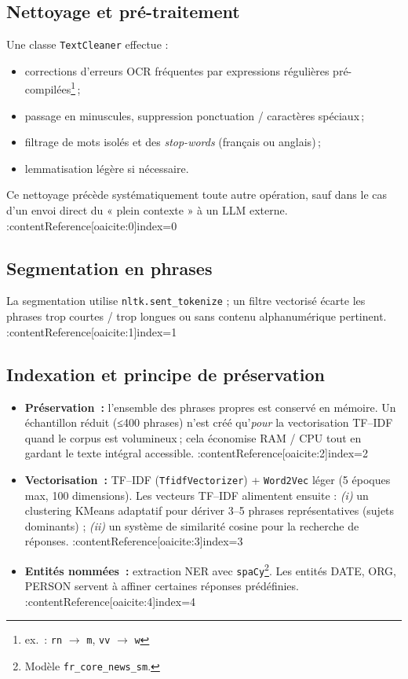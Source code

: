\documentclass[12pt,a4paper]{report}
\begin{document}
\subsection{Nettoyage et pré-traitement}

Une classe \texttt{TextCleaner} effectue :

\begin{itemize}
  \item corrections d’erreurs OCR fréquentes par expressions régulières pré-compilées\footnote{ex.~: \texttt{rn} $\rightarrow$ \texttt{m}, \texttt{vv} $\rightarrow$ \texttt{w}}\,;
  \item passage en minuscules, suppression ponctuation / caractères spéciaux\,;
  \item filtrage de mots isolés et des \emph{stop-words} (français ou anglais)\,;
  \item lemmatisation légère si nécessaire.
\end{itemize}

Ce nettoyage précède systématiquement toute autre opération, sauf dans le cas d’un envoi direct du « plein contexte » à un LLM externe. :contentReference[oaicite:0]{index=0}

\subsection{Segmentation en phrases}

La segmentation utilise \verb|nltk.sent_tokenize| ; un filtre vectorisé écarte les phrases trop courtes / trop longues ou sans contenu alphanumérique pertinent. :contentReference[oaicite:1]{index=1}

\subsection{Indexation et principe de préservation}

\begin{itemize}
  \item \textbf{Préservation~:} l’ensemble des phrases propres est conservé en mémoire.  
        Un échantillon réduit (≤400 phrases) n’est créé qu’\emph{pour} la vectorisation TF–IDF quand le corpus est volumineux ; cela économise RAM / CPU tout en gardant le texte intégral accessible. :contentReference[oaicite:2]{index=2}
  \item \textbf{Vectorisation~:} TF–IDF (\texttt{TfidfVectorizer}) + \texttt{Word2Vec} léger (5 époques max, 100 dimensions).  
        Les vecteurs TF–IDF alimentent ensuite :  
        \emph{(i)} un clustering KMeans adaptatif pour dériver 3–5 phrases représentatives (sujets dominants) ;  
        \emph{(ii)} un système de similarité cosine pour la recherche de réponses. :contentReference[oaicite:3]{index=3}
  \item \textbf{Entités nommées~:} extraction NER avec \texttt{spaCy}\footnote{Modèle \texttt{fr\_core\_news\_sm}.}. Les entités DATE, ORG, PERSON servent à affiner certaines réponses prédéfinies. :contentReference[oaicite:4]{index=4}
\end{itemize}
\end{document}
